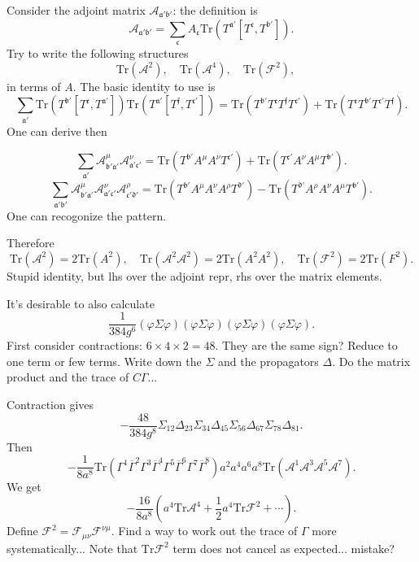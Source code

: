 
Consider the adjoint matrix $\mathcal{A}_{\mathfrak{a}'\mathfrak{b}'}$:
the definition is
\[
	\mathcal{A}_{\mathfrak{a}'\mathfrak{b}'}
	= \sum_{\mathfrak{c}} A_{\mathfrak{c}}
	\mathrm{Tr} ( T^{\mathfrak{a}'} [T^{\mathfrak{c}},T^{\mathfrak{b}'}])
.\] 
Try to write the following structures
\[
\mathrm{Tr}(\mathcal{A}^2),\quad
\mathrm{Tr}(\mathcal{A}^4),\quad
\mathrm{Tr}(\mathcal{F}^2),\quad
\] 
in terms of $A$.
The basic identity to use is
\[
	\sum_{\mathfrak{a}'} \mathrm{Tr}( T^{\mathfrak{b}'}
	[T^{\mathfrak{e}},T^{\mathfrak{a}'}])
	\mathrm{Tr}(T^{\mathfrak{a}'}[T^{\mathfrak{f}},T^{\mathfrak{c}'}])
	=\mathrm{Tr}(T^{\mathfrak{b}'}T^{\mathfrak{e}}
	T^{\mathfrak{f}}T^{\mathfrak{c}'})
	+\mathrm{Tr}(T^{\mathfrak{e}}T^{\mathfrak{b}'}
	T^{\mathfrak{c}'}T^{\mathfrak{f}})
.\] 
One can derive then
\begin{correct}
\[
	\sum_{\mathfrak{a}'}
	\mathcal{A}_{\mathfrak{b}' \mathfrak{a}'}^\mu
	\mathcal{A}_{\mathfrak{a}' \mathfrak{c}'}^\nu
	= \mathrm{Tr}(T^{\mathfrak{b}'} A^\mu A^\nu T^{\mathfrak{c}'})
	+ \mathrm{Tr}(T^{\mathfrak{c}'} A^\nu A^\mu T^{\mathfrak{b}'})
.\] 
\[
	\sum_{\mathfrak{a}' \mathfrak{b}'}
	\mathcal{A}^\mu_{\mathfrak{b}' \mathfrak{a}'}
	\mathcal{A}^\nu_{\mathfrak{a}' \mathfrak{c}'}
	\mathcal{A}^\rho_{\mathfrak{c}' \mathfrak{d}'}
	= \mathrm{Tr}(T^{\mathfrak{b}'}A^\mu A^\nu A^\rho T^{\mathfrak{d}'})
	- \mathrm{Tr}(T^{\mathfrak{d}'} A^\rho A^\nu A^\mu T^{\mathfrak{b}'})
.\] 
One can recogonize the pattern.
\end{correct}
Therefore
\[
\mathrm{Tr}(\mathcal{A}^2) = 2 \mathrm{Tr}(A^2),\quad
\mathrm{Tr} (\mathcal{A}^2 \mathcal{A}^2) = 2 \mathrm{Tr} (A^2 A^2),\quad
\mathrm{Tr}(\mathcal{F}^2) = 2 \mathrm{Tr}(F^2)
.\] 
Stupid identity, but lhs over the adjoint repr, rhs over the matrix elements.

It's desirable to also calculate
\[
\frac{1}{384 g^6} (\varphi \Sigma \varphi)(\varphi \Sigma \varphi)(\varphi \Sigma \varphi)(\varphi \Sigma \varphi)
.\] 
First consider contractions: $6 \times 4 \times 2 = 48$.
They are the same sign? Reduce to one term or few terms.
Write down the $\Sigma$ and the propagators $\Delta$.
Do the matrix product and the trace of $C\Gamma$...

Contraction gives
\[
	-\frac{48}{384 g^8} \Sigma_{12} \Delta_{23} \Sigma_{34}
	\Delta_{45} \Sigma_{56} \Delta_{67} \Sigma_{78} \Delta_{81}
.\] 
Then
\[
-\frac{1}{8 a^8} \mathrm{Tr}(\Gamma^1 \overline{\Gamma}^2
\Gamma^3 \overline{\Gamma}^4 \Gamma^5 \overline{\Gamma}^6
\Gamma^7 \overline{\Gamma}^8)
a^2 a^4 a^6 a^8 \mathrm{Tr}(\mathcal{A}^1 \mathcal{A}^3 \mathcal{A}^5 \mathcal{A}^7)
.\] 
We get
\[
- \frac{16}{8 a^8} \left(  a^4 \mathrm{Tr}\mathcal{A}^4
+ \frac{1}{2} a^4 \mathrm{Tr}\mathcal{F}^2
+ \cdots\right)
.\] 
Define $\mathcal{F}^2 = \mathcal{F}_{\mu\nu} \mathcal{F}^{\nu\mu}$.
Find a way to work out the trace of $\Gamma$ more systematically...
Note that $\mathrm{Tr}\mathcal{F}^2$ term does not cancel as expected...
mistake?

